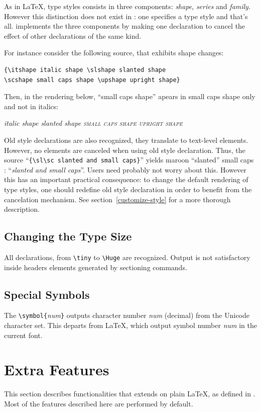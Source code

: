 As in \LaTeX{}, type styles consists in three components:
\emph{shape}, \emph{series} and \emph{family}.
However this distinction does not exist in \html: one specifies a
type style and that's all.
\hevea{} implements the three components by making one declaration to
cancel the effect of other declarations of the same kind.
\begin{htmlonly}
For instance consider the following source, that exhibits shape changes:
\begin{verbatim}
{\itshape italic shape \slshape slanted shape
\scshape small caps shape \upshape upright shape}
\end{verbatim}
Then, in the rendering below, ``small caps shape'' apears in small caps shape
only and not in italics:
\begin{htmlout}
{\itshape italic shape \slshape slanted shape
\scshape small caps shape \upshape upright shape}
\end{htmlout}
\end{htmlonly}


Old style declarations are also recognized, they translate to
text-level elements. However, no elements are canceled when using
old style declaration. Thus, the source
``\verb+{\sl\sc slanted and small caps}+'' yields maroon ``slanted'' small caps
\ifhevea: ``{\sl\sc slanted and small caps}''\fi.
Users need probably not worry about this. However this has an
important practical consequence: to change the default rendering of
type styles, one should redefine old style declaration in order to
benefit from the cancelation mechanism. See
section~\ref{customize-style} for a more thorough description.


\subsection{Changing the Type Size}
All declarations, from \verb+\tiny+ to \verb+\Huge+ are recognized.
Output is not satisfactory inside headers elements
generated by sectioning commands.

\subsection{Special Symbols}

The \verb+\symbol{+{\it num}\verb+}+ outputs character number {\it num}
(decimal) from the Unicode character set.
This departs from \LaTeX{}, which output symbol number \textit{num} in
the current font.

\section{Extra Features}
This section describes \hevea{} functionalities that extends on plain \LaTeX{},
as defined in \cite{latex}.
Most of the features described here are performed by default.


